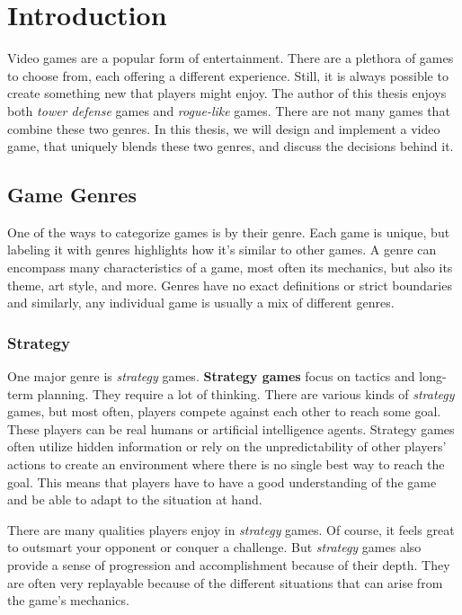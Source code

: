 \chapter{Introduction}

Video games are a popular form of entertainment.
There are a plethora of games to choose from, each offering a different experience.
Still, it is always possible to create something new that players might enjoy.
The author of this thesis enjoys both \emph{tower defense} games and \emph{rogue-like} games.
There are not many games that combine these two genres.
In this thesis, we will design and implement a video game, that uniquely blends these two genres, and discuss the decisions behind it.

\section{Game Genres}

One of the ways to categorize games is by their genre.
Each game is unique, but labeling it with genres highlights how it's similar to other games.
A genre can encompass many characteristics of a game, most often its mechanics, but also its theme, art style, and more.
Genres have no exact definitions or strict boundaries and similarly, any individual game is usually a mix of different genres.

\subsection{Strategy}

One major genre is \emph{strategy} games.
\textbf{Strategy games} focus on tactics and long-term planning.
They require a lot of thinking.
There are various kinds of \emph{strategy} games, but most often, players compete against each other to reach some goal.
These players can be real humans or artificial intelligence agents.
Strategy games often utilize hidden information or rely on the unpredictability of other players' actions to create an environment where there is no single best way to reach the goal.
This means that players have to have a good understanding of the game and be able to adapt to the situation at hand.

There are many qualities players enjoy in \emph{strategy} games.
Of course, it feels great to outsmart your opponent or conquer a challenge.
But \emph{strategy} games also provide a sense of progression and accomplishment because of their depth.
They are often very replayable because of the different situations that can arise from the game's mechanics.

